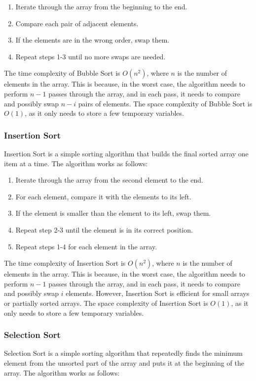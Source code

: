 \documentclass[a4paper]{article}
\begin{document}
\begin{enumerate}
\item Iterate through the array from the beginning to the end.
\item Compare each pair of adjacent elements.
\item If the elements are in the wrong order, swap them.
\item Repeat steps 1-3 until no more swaps are needed.
\end{enumerate}
The time complexity of Bubble Sort is $O(n^2)$, where $n$ is the number of elements in the array. This is because, in the worst case, the algorithm needs to perform $n-1$ passes through the array, and in each pass, it needs to compare and possibly swap $n-i$ pairs of elements. The space complexity of Bubble Sort is $O(1)$, as it only needs to store a few temporary variables.

\subsubsection{Insertion Sort}

Insertion Sort is a simple sorting algorithm that builds the final sorted array one item at a time. The algorithm works as follows:

\begin{enumerate}
\item Iterate through the array from the second element to the end.
\item For each element, compare it with the elements to its left.
\item If the element is smaller than the element to its left, swap them.
\item Repeat step 2-3 until the element is in its correct position.
\item Repeat steps 1-4 for each element in the array.
\end{enumerate}

The time complexity of Insertion Sort is $O(n^2)$, where $n$ is the number of elements in the array. This is because, in the worst case, the algorithm needs to perform $n-1$ passes through the array, and in each pass, it needs to compare and possibly swap $i$ elements. However, Insertion Sort is efficient for small arrays or partially sorted arrays. The space complexity of Insertion Sort is $O(1)$, as it only needs to store a few temporary variables.


\subsubsection{Selection Sort}
Selection Sort is a simple sorting algorithm that repeatedly finds the minimum element from the unsorted part of the array and puts it at the beginning of the array. The algorithm works as follows:
\end{document}
